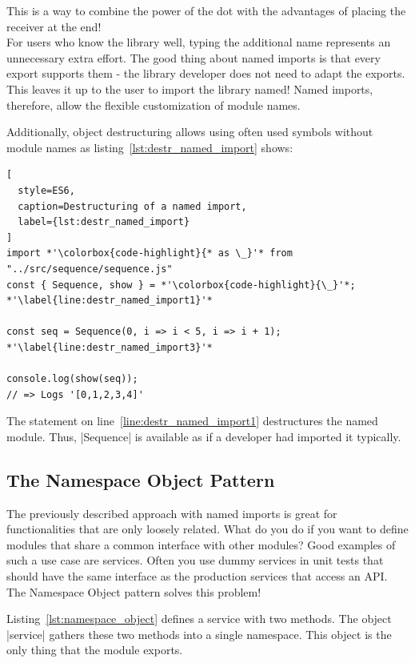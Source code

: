 This is a way to combine the power of the dot with the advantages of placing
the receiver at the end! \\
For users who know the library well, typing the additional name represents an
unnecessary extra effort. The good thing about named imports is that every
export supports them - the library developer does not need to adapt the
exports. \\
This leaves it up to the user to import the library named! Named
imports, therefore, allow the flexible customization of module names.

Additionally, object destructuring allows using often used symbols without
module names as listing~\ref{lst:destr_named_import} shows:

\begin{lstlisting}[
  style=ES6,
  caption=Destructuring of a named import,
  label={lst:destr_named_import}
]
import *'\colorbox{code-highlight}{* as \_}'* from "../src/sequence/sequence.js" 
const { Sequence, show } = *'\colorbox{code-highlight}{\_}'*; *'\label{line:destr_named_import1}'*

const seq = Sequence(0, i => i < 5, i => i + 1); *'\label{line:destr_named_import3}'*

console.log(show(seq));
// => Logs '[0,1,2,3,4]'
\end{lstlisting}

The statement on line~\ref{line:destr_named_import1} destructures the named
module. Thus, |Sequence| is available as if a developer had imported it
typically.


\subsection{The Namespace Object Pattern} %
\label{sub:The Namespace Object Pattern}
The previously described approach with named imports is great for
functionalities that are only loosely related. What do you do if you want to
define modules that share a common interface with other modules? Good examples
of such a use case are services. Often you use dummy services in unit tests
that should have the same interface as the production services that access an
API. The Namespace Object pattern solves this problem!

Listing~\ref{lst:namespace_object} defines a service with two methods. The
object |service| gathers these two methods into a single namespace. This object
is the only thing that the module exports.

